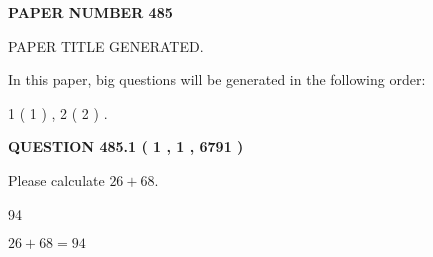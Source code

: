 \documentclass[12pt]{article}
\begin{document}
   
   
   
\newpage 
\setcounter{page}{ 
   485001 } 
   
   
   
   
 {\textbf{ \Large{ PAPER NUMBER  485  }}}
   
   
\vspace{0.2in}
   
   
   
   
   
   
   
   
 \vspace{0.2in}
 
 
 
 
   
   
 PAPER TITLE GENERATED.
   
   
   
\vspace{0.2in}
   
In this paper, big questions will be generated in the following order: 
   
   
   1 ( 1 )
 ,
   2 ( 2 )
 .
  
\vspace{0.2in}
  
{\textbf{\Large{QUESTION
485.1 
 ( 1 , 1 , 6791 )
}}}
  
  
 
Please calculate $ %
26 +  %
68 $.
 
 
 
\noindent{}
 
 

94
 
 
\noindent{}
 
 

 
 
 
\noindent{}
 
 

$ %
26 +  %
68=   %
94$
 
 
\noindent{}
 
 

 
   
   
   
\end{document}
